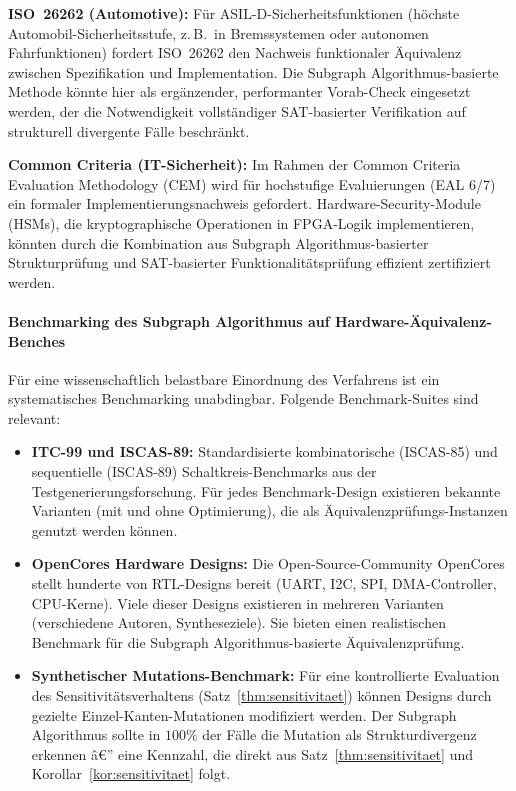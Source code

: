 ﻿\documentclass[12pt,a4paper]{report}
\begin{document}
\textbf{ISO~26262 (Automotive):} Für ASIL-D-Sicherheitsfunktionen (höchste
Automobil-Sicherheitsstufe, z.\,B.\ in Bremssystemen oder autonomen Fahrfunktionen)
fordert ISO~26262 den Nachweis funktionaler Äquivalenz zwischen Spezifikation und
Implementation. Die Subgraph Algorithmus-basierte Methode könnte hier als
ergänzender, performanter Vorab-Check eingesetzt werden, der die Notwendigkeit
vollständiger SAT-basierter Verifikation auf strukturell divergente Fälle beschränkt.

\textbf{Common Criteria (IT-Sicherheit):} Im Rahmen der Common Criteria Evaluation
Methodology (CEM) wird für hochstufige Evaluierungen (EAL 6/7) ein formaler
Implementierungsnachweis gefordert. Hardware-Security-Module (HSMs), die kryptographische
Operationen in FPGA-Logik implementieren, könnten durch die Kombination aus
Subgraph Algorithmus-basierter Strukturprüfung und SAT-basierter Funktionalitätsprüfung
effizient zertifiziert werden.

\paragraph{Benchmarking des Subgraph Algorithmus auf Hardware-Äquivalenz-Benches}

Für eine wissenschaftlich belastbare Einordnung des Verfahrens ist ein systematisches
Benchmarking unabdingbar. Folgende Benchmark-Suites sind relevant:

\begin{itemize}
    \item \textbf{ITC-99 und ISCAS-89:} Standardisierte kombinatorische (ISCAS-85) und
          sequentielle (ISCAS-89) Schaltkreis-Benchmarks aus der Testgenerierungsforschung.
          Für jedes Benchmark-Design existieren bekannte Varianten (mit und ohne
          Optimierung), die als Äquivalenzprüfungs-Instanzen genutzt werden können.
    \item \textbf{OpenCores Hardware Designs:} Die Open-Source-Community OpenCores stellt
          hunderte von RTL-Designs bereit (UART, I2C, SPI, DMA-Controller, CPU-Kerne).
          Viele dieser Designs existieren in mehreren Varianten (verschiedene Autoren,
          Syntheseziele). Sie bieten einen realistischen Benchmark für die
          Subgraph Algorithmus-basierte Äquivalenzprüfung.
    \item \textbf{Synthetischer Mutations-Benchmark:} Für eine kontrollierte Evaluation
          des Sensitivitätsverhaltens (Satz~\ref{thm:sensitivitaet}) können Designs
          durch gezielte Einzel-Kanten-Mutationen modifiziert werden.
          Der Subgraph Algorithmus sollte in $100\%$ der Fälle die Mutation als
          Strukturdivergenz erkennen â€” eine Kennzahl, die direkt aus
          Satz~\ref{thm:sensitivitaet} und Korollar~\ref{kor:sensitivitaet} folgt.
\end{itemize}
\end{document}
